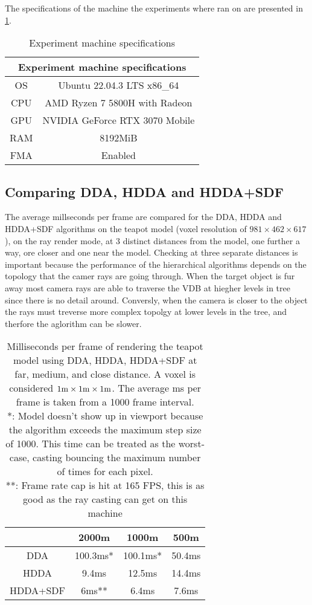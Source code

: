 The specifications of the machine the experiments where ran on are presented in \cref{specs}.
\begin{table}[h]
  \centering
\begin{tabular}{|c||c|}
  \hline
  \multicolumn{2}{|c|}{Experiment machine specifications} \\
  \hline
  OS & Ubuntu 22.04.3 LTS x86\_64\\
  \hline
  CPU & AMD Ryzen 7 5800H with Radeon\\
  \hline
  GPU &  NVIDIA GeForce RTX 3070 Mobile\\
  \hline
  RAM & 8192MiB \\
  \hline
  FMA & Enabled \\
  \hline
\end{tabular}
  \caption{Experiment machine specifications}
  \label{specs}
\end{table}

\subsection{Comparing DDA, HDDA and HDDA+SDF}

The average millseconds per frame are compared for the DDA, HDDA and HDDA+SDF algorithms on the teapot model (voxel resolution of $981\times462\times617$), on the ray render mode, at 3 distinct distances from the model, one further a way, ore closer and one near the model. Checking at three separate distances is important because the performance of the hierarchical algorithms depends on the topology that the camer rays are going through. When the target object is fur away most camera rays are able to traverse the VDB at hiegher levels in tree since there is no detail around. Conversly, when the camera is closer to the object the rays must treverse more complex topolgy at lower levels in the tree, and therfore the aglorithm can be slower.

\begin{table}[h]
  \centering
  \begin{tabular}{|c||c|c|c|}
    \hline
    & 2000m & 1000m & 500m \\
    \hline
    DDA & 100.3ms* & 100.1ms* & 50.4ms \\
    \hline
    HDDA & 9.4ms & 12.5ms & 14.4ms \\
    \hline
    HDDA+SDF & 6ms** & 6.4ms & 7.6ms\\
    \hline
  \end{tabular}
  \caption{Milliseconds per frame of rendering the teapot model using DDA, HDDA, HDDA+SDF at far, medium, and close distance. A voxel is considered $1\rm{m}\times1\rm{m}\times1\rm{m}$. The average ms per frame is taken from a 1000 frame interval.\\
    *: Model doesn't show up in viewport because the algorithm exceeds the maximum step size of 1000. This time can be treated as the worst-case, casting bouncing the maximum number of times for each pixel.\\
    **: Frame rate cap is hit at 165 FPS, this is as good as the ray casting can get on this machine}
\end{table}

